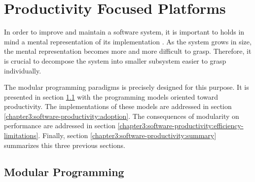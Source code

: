 \section{Productivity Focused Platforms} \label{chapter3:software-productivity}


In order to improve and maintain a software system, it is important to holds in mind a mental representation of its implementation \cite{Simon1962}.
As the system grows in size, the mental representation becomes more and more difficult to grasp.
Therefore, it is crucial to decompose the system into smaller subsystem easier to grasp individually.


The modular programming paradigms is precisely designed for this purpose.
It is presented in section \ref{chapter3:software-productivity:modularity} with the programming models oriented toward productivity.
The implementations of these models are addressed in section \ref{chapter3:software-productivity:adoption}.
The consequences of modularity on performance are addressed in section \ref{chapter3:software-productivity:efficiency-limitations}.
Finally, section \ref{chapter3:software-productivity:summary} summarizes this three previous sections.

\subsection{Modular Programming} \label{chapter3:software-productivity:modularity}

\begin{figure}
%
\end{figure}


